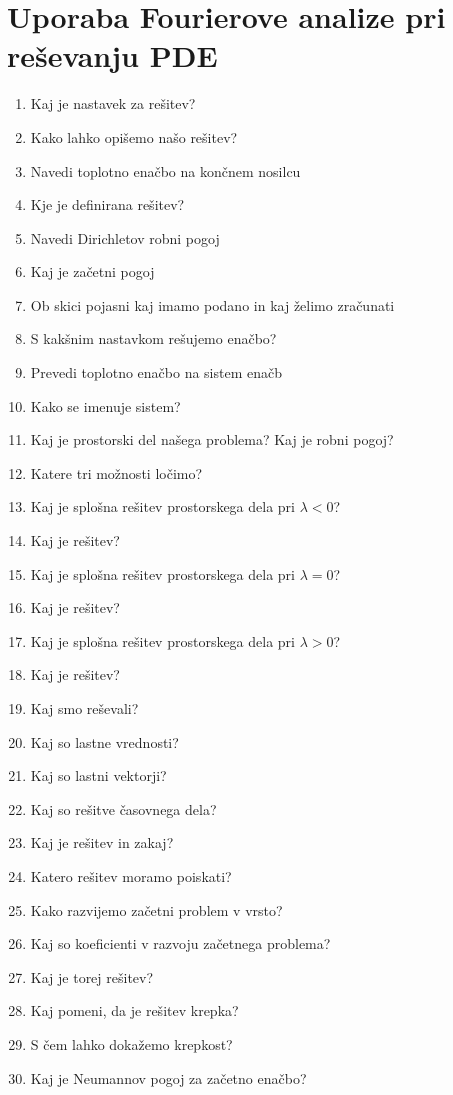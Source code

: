 \documentclass{article}
\begin{document}
    \section{Uporaba Fourierove analize pri reševanju PDE}
    \begin{enumerate}
        \item Kaj je nastavek za rešitev?
        \item Kako lahko opišemo našo rešitev?
        \item Navedi toplotno enačbo na končnem nosilcu
        \item Kje je definirana rešitev?
        \item Navedi Dirichletov robni pogoj
        \item Kaj je začetni pogoj
        \item Ob skici pojasni kaj imamo podano in kaj želimo zračunati
        \item S kakšnim nastavkom rešujemo enačbo?
        \item Prevedi toplotno enačbo na sistem enačb
        \item Kako se imenuje sistem?
        \item Kaj je prostorski del našega problema? Kaj je robni pogoj?
        \item Katere tri možnosti ločimo?
        \item Kaj je splošna rešitev prostorskega dela pri $\lambda < 0$?
        \item Kaj je rešitev?
        \item Kaj je splošna rešitev prostorskega dela pri $\lambda = 0$?
        \item Kaj je rešitev?
        \item Kaj je splošna rešitev prostorskega dela pri $\lambda > 0$?
        \item Kaj je rešitev?
        \item Kaj smo reševali?
        \item Kaj so lastne vrednosti?
        \item Kaj so lastni vektorji?
        \item Kaj so rešitve časovnega dela?
        \item Kaj je rešitev in zakaj?
        \item Katero rešitev moramo poiskati?
        \item Kako razvijemo začetni problem v vrsto?
        \item Kaj so koeficienti v razvoju začetnega problema?
        \item Kaj je torej rešitev?
        \item Kaj pomeni, da je rešitev krepka?
        \item S čem lahko dokažemo krepkost?
        \item Kaj je Neumannov pogoj za začetno enačbo?
    \end{enumerate}
\end{document}
